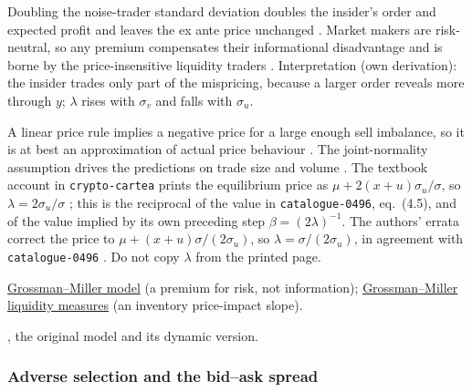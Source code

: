 \begin{qfmodel}
 Doubling the noise-trader standard deviation doubles the insider's order and expected profit and leaves the ex ante price unchanged \citep[same chap., p.~97]{catalogue-0496}. Market makers are risk-neutral, so any premium compensates their informational disadvantage and is borne by the price-insensitive liquidity traders \citep[chap.~``A Primer on the Microstructure of Financial Markets'', p.~31]{crypto-cartea}. Interpretation (own derivation): the insider trades only part of the mispricing, because a larger order reveals more through $y$; $\lambda$ rises with $\sigma_v$ and falls with $\sigma_u$.

 A linear price rule implies a negative price for a large enough sell imbalance, so it is at best an approximation of actual price behaviour \citep[chap.~``Strategic Trader Models I: Informed Traders'', p.~96]{catalogue-0496}. The joint-normality assumption drives the predictions on trade size and volume \citep[same chap., p.~98]{catalogue-0496}. The textbook account in \nolinkurl{crypto-cartea} prints the equilibrium price as $\mu+2(x+u)\sigma_u/\sigma$, so $\lambda=2\sigma_u/\sigma$ \citep[chap.~``A Primer on the Microstructure of Financial Markets'', p.~33]{crypto-cartea}; this is the reciprocal of the value in \nolinkurl{catalogue-0496}, eq.~(4.5), and of the value implied by its own preceding step $\beta=(2\lambda)^{-1}$. The authors' errata correct the price to $\mu+(x+u)\sigma/(2\sigma_u)$, so $\lambda=\sigma/(2\sigma_u)$, in agreement with \nolinkurl{catalogue-0496} \citep[entries for p.~33]{crypto-cartea-errata}. Do not copy $\lambda$ from the printed page.

 \hyperref[mod:grossman-miller]{Grossman--Miller model} (a premium for risk, not information); \hyperref[res:grossman-miller-liquidity-measures]{Grossman--Miller liquidity measures} (an inventory price-impact slope).

 \citep{s6-kyle}, the original model and its dynamic version.

\end{qfmodel}

\subsubsection{Adverse selection and the bid--ask spread}

